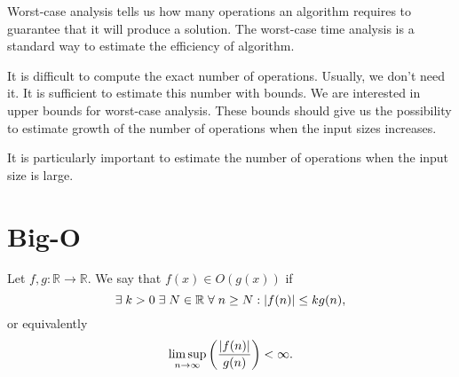 Worst-case analysis tells us how many operations an algorithm requires to guarantee that it will produce a solution. The worst-case time analysis is a standard way to estimate the efficiency of algorithm. 

It is difficult to compute the exact number of operations. Usually, we don't need it. It is sufficient to estimate this number with bounds. We are interested in upper bounds for worst-case analysis. These bounds should give us the possibility to estimate growth of the number of operations when the input sizes increases.

\begin{remark}
    It is particularly important to estimate the number of operations when the input size is large.
\end{remark}

\section{Big-O}

\begin{definition}[Big-$O$]
Let $f, g : \mathbb R \to \mathbb R$. We say that $f(x) \in O(g(x))$ if \[ \exists \; k > 0 \; \exists \; N \in \mathbb R \; \forall \; n \geq N : \lvert f(n)\rvert \leq k g(n), \] or equivalently \[ \limsup_{n \to \infty} \left( \frac{\lvert f(n)\rvert}{g(n)} \right) < \infty. \]
\end{definition}

